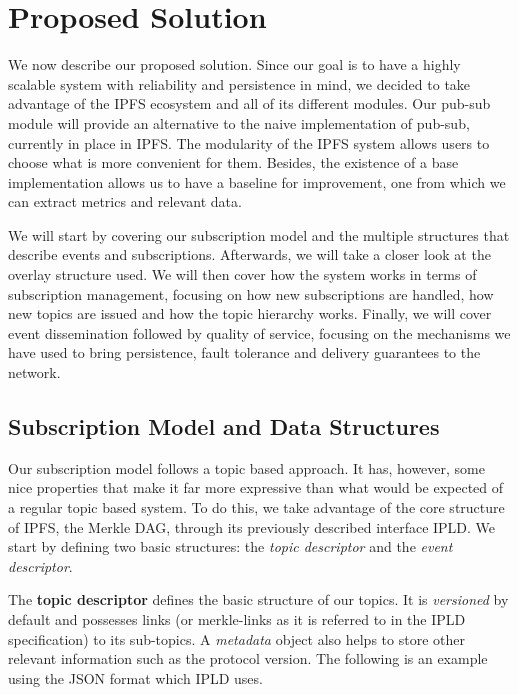 
%
%

\section{Proposed Solution}

We now describe our proposed solution. Since our goal is to have a
highly scalable system with reliability and persistence in mind, we
decided to take advantage of the IPFS ecosystem and all of its different
modules. Our pub-sub module will provide an alternative to the naive
implementation of pub-sub, currently in place in IPFS. The modularity of
the IPFS system allows users to choose what is more convenient for them.
Besides, the existence of a base implementation allows us to have a
baseline for improvement, one from which we can extract metrics and
relevant data.

We will start by covering our subscription model and the multiple
structures that describe events and subscriptions. Afterwards, we will
take a closer look at the overlay structure used. We will then cover how
the system works in terms of subscription management, focusing on how
new subscriptions are handled, how new topics are issued and how the
topic hierarchy works. Finally, we will cover event dissemination
followed by quality of service, focusing on the mechanisms we have used
to bring persistence, fault tolerance and delivery guarantees to the
network.

\subsection{Subscription Model and Data
Structures}\label{subscription-model-and-data-structures}

Our subscription model follows a topic based approach. It has, however,
some nice properties that make it far more expressive than what would be
expected of a regular topic based system. To do this, we take advantage
of the core structure of IPFS, the Merkle DAG, through its previously
described interface IPLD. We start by defining two basic structures: the
\emph{topic descriptor} and the \emph{event descriptor}.

The \textbf{topic descriptor} defines the basic structure of our topics.
It is \emph{versioned} by default and possesses links (or merkle-links
as it is referred to in the IPLD specification) to its sub-topics. A
\emph{metadata} object also helps to store other relevant information
such as the protocol version. The following is an example using the JSON
format which IPLD uses.

